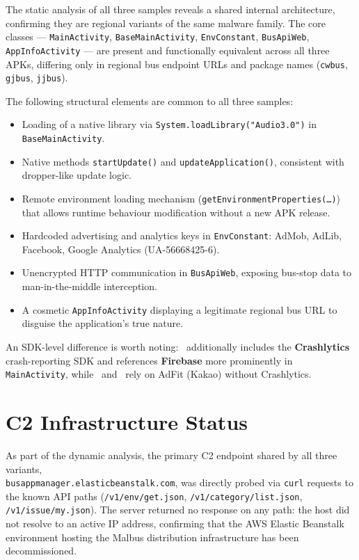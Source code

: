 The static analysis of all three samples reveals a shared internal architecture, confirming they are regional variants of the same malware family.
The core classes --- \texttt{MainActivity}, \texttt{BaseMainActivity}, \texttt{EnvConstant}, \texttt{BusApiWeb}, \texttt{AppInfoActivity} --- are present and functionally equivalent across all three APKs, differing only in regional bus endpoint URLs and package names (\texttt{cwbus}, \texttt{gjbus}, \texttt{jjbus}).

The following structural elements are common to all three samples:

\begin{itemize}
    \item Loading of a native library via \texttt{System.loadLibrary("Audio3.0")} in \texttt{BaseMainActivity}.
    \item Native methods \texttt{startUpdate()} and \texttt{updateApplication()}, consistent with dropper-like update logic.
    \item Remote environment loading mechanism (\texttt{getEnvironmentProperties(\ldots)}) that allows runtime behaviour modification without a new APK release.
    \item Hardcoded advertising and analytics keys in \texttt{EnvConstant}: AdMob, AdLib, Facebook, Google Analytics (UA-56668425-6).
    \item Unencrypted HTTP communication in \texttt{BusApiWeb}, exposing bus-stop data to man-in-the-middle interception.
    \item A cosmetic \texttt{AppInfoActivity} displaying a legitimate regional bus URL to disguise the application's true nature.
\end{itemize}

An SDK-level difference is worth noting: \threer \  additionally includes the \textbf{Crashlytics} crash-reporting SDK and references \textbf{Firebase} more prominently in \texttt{MainActivity}, while \oner \  and \twor \  rely on AdFit (Kakao) without Crashlytics.

\section{C2 Infrastructure Status}
\label{sec:c2status}

As part of the dynamic analysis, the primary C2 endpoint shared by all three variants,\\
\texttt{busappmanager.elasticbeanstalk.com}, was directly probed via \texttt{curl} requests to the known API paths (\texttt{/v1/env/get.json}, \texttt{/v1/category/list.json}, \texttt{/v1/issue/my.json}).
The server returned no response on any path: the host did not resolve to an active IP address, confirming that the AWS Elastic Beanstalk environment hosting the Malbus distribution infrastructure has been decommissioned.

